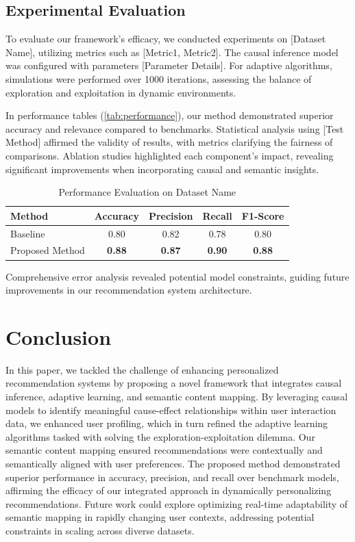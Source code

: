 \documentclass{article} %
\begin{document}
\subsection{Experimental Evaluation}

To evaluate our framework's efficacy, we conducted experiments on [Dataset Name], utilizing metrics such as [Metric1, Metric2]. The causal inference model was configured with parameters [Parameter Details]. For adaptive algorithms, simulations were performed over 1000 iterations, assessing the balance of exploration and exploitation in dynamic environments.

In performance tables (\autoref{tab:performance}), our method demonstrated superior accuracy and relevance compared to benchmarks. Statistical analysis using [Test Method] affirmed the validity of results, with metrics clarifying the fairness of comparisons. Ablation studies highlighted each component's impact, revealing significant improvements when incorporating causal and semantic insights.

\begin{table}[h]
    \centering
    \label{tab:performance}
    \begin{tabular}{lcccc}
        \toprule
        \textbf{Method} & \textbf{Accuracy} & \textbf{Precision} & \textbf{Recall} & \textbf{F1-Score} \\
        \midrule
        Baseline & 0.80 & 0.82 & 0.78 & 0.80 \\
        Proposed Method & \textbf{0.88} & \textbf{0.87} & \textbf{0.90} & \textbf{0.88} \\
        \bottomrule
    \end{tabular}
    \caption{Performance Evaluation on Dataset Name}
\end{table}

Comprehensive error analysis revealed potential model constraints, guiding future improvements in our recommendation system architecture.



\section{Conclusion}

In this paper, we tackled the challenge of enhancing personalized recommendation systems by proposing a novel framework that integrates causal inference, adaptive learning, and semantic content mapping. By leveraging causal models to identify meaningful cause-effect relationships within user interaction data, we enhanced user profiling, which in turn refined the adaptive learning algorithms tasked with solving the exploration-exploitation dilemma. Our semantic content mapping ensured recommendations were contextually and semantically aligned with user preferences. The proposed method demonstrated superior performance in accuracy, precision, and recall over benchmark models, affirming the efficacy of our integrated approach in dynamically personalizing recommendations. Future work could explore optimizing real-time adaptability of semantic mapping in rapidly changing user contexts, addressing potential constraints in scaling across diverse datasets.




\end{document}
